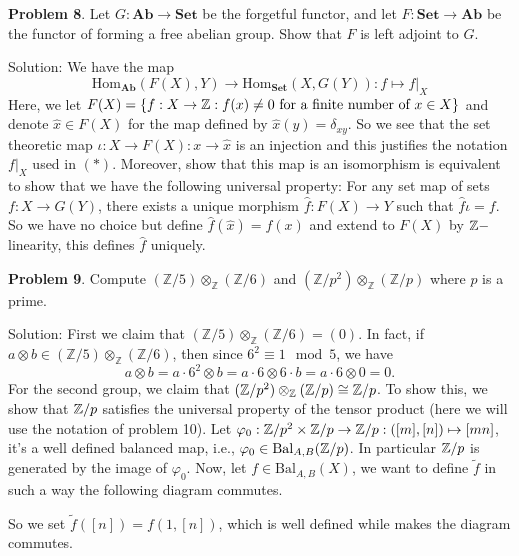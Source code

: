 \begin{dang}
    \textbf{Problem 8}. Let \(G:\mathbf{Ab}\to \mathbf{Set}\) be the forgetful functor, and let \(F:\mathbf{Set}\to \mathbf{Ab}\) 
    be the functor of forming a free abelian group. Show that \(F\) is left adjoint to \(G\).
\end{dang}
Solution: We have the map 
\begin{equation}
    \text{Hom}_{\textbf{Ab}}(F(X),Y) \rightarrow \text{Hom}_{\textbf{Set}}(X,G(Y)): f\mapsto f|_X
\end{equation}
Here, we let 
$F(X) = \{f:X\to \mathbb{Z}: f(x)\neq 0\text{ for a finite number of } x\in X\}$ and denote
$\hat{x}\in F(X)$ for the map defined by $\hat{x}(y)=\delta_{xy}$. So we see that the 
set theoretic map $\iota:X\to F(X):x\to \hat{x}$ is an injection and this justifies 
the notation $f|_X$ used in $(*)$. Moreover, show that this map is an isomorphism is 
equivalent to show that we have the following universal property: For any set map of sets 
$f:X\to G(Y)$, there exists a unique morphism $\hat{f}:F(X)\to Y$ such that $\hat{f}\iota = f$. So we have no choice but 
define $\hat{f}(\hat{x})=f(x)$ and extend to $F(X)$ by $\mathbb{Z}-$linearity, this defines $\hat{f}$ uniquely.



\begin{dang}
\textbf{Problem 9}. Compute $(\mathbb{Z} / 5)\otimes_{\mathbb{Z}}(\mathbb{Z} / 6)$ 
and $(\mathbb{Z} / p^{2})\otimes_{\mathbb{Z}}(\mathbb{Z} / p)$ where $p$ is a prime.
\end{dang}
Solution: First we claim that $(\mathbb{Z} / 5)\otimes_{\mathbb{Z}}(\mathbb{Z} / 6)=(0)$. In fact, if 
$a\otimes b\in (\mathbb{Z} / 5)\otimes_{\mathbb{Z}}(\mathbb{Z} / 6)$, then since $6^2\equiv1\mod5$, we have
\begin{equation}
    a\otimes b = a\cdot 6^2\otimes b = a\cdot6\otimes 6\cdot b = a\cdot6\otimes 0=0.
\end{equation}
For the second group, we claim that $(\mathbb{Z} / p^{2})\otimes_{\mathbb{Z}}(\mathbb{Z} / p)\cong\mathbb{Z}/p$. To show this, 
we show that $\mathbb{Z}/p$ satisfies the universal property of the tensor product (here we will use the notation of 
problem 10). Let $\varphi_0:\mathbb{Z}/p^2\times\mathbb{Z}/p\to \mathbb{Z}/p:([m],[n])\mapsto [mn]$, it's a well defined balanced map, i.e., 
$\varphi_0\in\text{Bal}_{A,B}(\mathbb{Z}/p)$. In particular $\mathbb{Z}/p$ is generated by the image of $\varphi_0$. Now, let 
$f\in \text{Bal}_{A,B}(X)$, we want to define $\tilde{f}$ in such a way the following diagram commutes.
\begin{center}
\end{center}
So we set $\tilde{f}([n])=f(1,[n])$, which is well defined while makes the diagram commutes.

